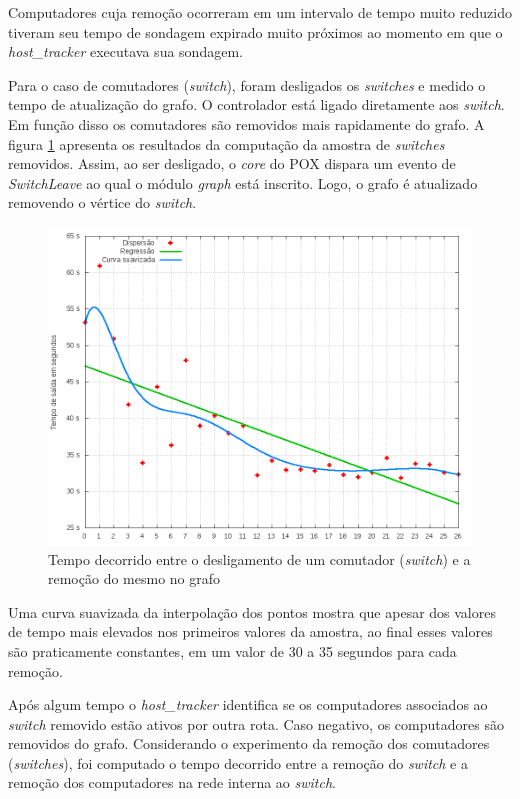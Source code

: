 Computadores cuja remoção ocorreram em um intervalo de tempo muito reduzido
tiveram seu tempo de sondagem expirado muito próximos ao momento em que 
o \emph{host\_tracker} executava sua sondagem. 

Para o caso de comutadores (\emph{switch}), foram desligados os 
\emph{switches} e medido o tempo de atualização do grafo.
O controlador está ligado diretamente aos \emph{switch}. 
Em função disso os comutadores são removidos mais rapidamente do grafo.
A figura \ref{fig:switch-leave-time} apresenta os resultados da 
computação da amostra de \emph{switches} removidos.
Assim, ao ser desligado, o \emph{core} do POX dispara um evento 
de \emph{SwitchLeave} ao qual o módulo \emph{graph} está inscrito. 
Logo, o grafo é atualizado removendo o vértice do \emph{switch}.

\begin{figure}[h!]
    \centering
    \label{fig:switch-leave-time}
    \includegraphics[width=\linewidth]{img/switch-leave-time}
    \caption{Tempo decorrido entre o desligamento de um comutador 
    (\emph{switch}) e a remoção do mesmo no grafo}
\end{figure}

Uma curva suavizada da interpolação dos pontos mostra que apesar dos valores
de tempo mais elevados nos primeiros valores da amostra, ao final esses valores
são praticamente constantes, em um valor de 30 a 35 segundos para cada 
remoção.

Após algum tempo o \emph{host\_tracker} identifica se os computadores 
associados ao \emph{switch} removido estão ativos por outra rota. 
Caso negativo, os computadores são removidos do grafo.
Considerando o experimento da remoção dos comutadores (\emph{switches}),
foi computado o tempo decorrido entre a remoção do \emph{switch} e a 
remoção dos computadores na rede interna ao \emph{switch}. 

